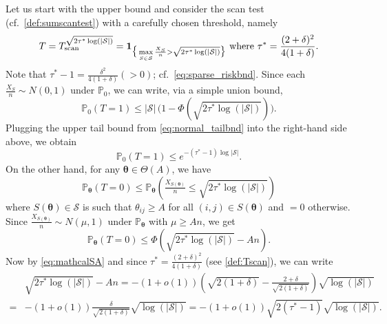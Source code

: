 \documentclass[11pt,reqno,letterpaper]{amsart}
\numberwithin{equation}{section}
\theoremstyle{plain}
\def \btheta{\boldsymbol{\theta}}
\def \P{\mathbb{P}}
\begin{document}
 Let us start with the upper bound and 
consider the scan test (cf.~\eqref{def:sumscantest}) with a carefully chosen threshold, namely
\begin{equation}\label{def:Tscan}
T = T_{{\rm scan}}^{\sqrt{2\tau^*\log(|\mathcal{S}|)}} = \mathbf{1}_{\big\{\max\limits_{S\in 
\mathcal{S}}\frac{X_{S}}{n}>\sqrt{2\tau^*\log(|\mathcal{S}|)}\big\}}\,\, 
\mbox{where }  \tau^\ast = \frac{(2 + \delta)^2}{4(1 + \delta)}.
\end{equation}
Note that $\tau^\ast - 1 = \frac{\delta^2}{4(1 + \delta)} (> 0)$; cf.~\eqref{eq:sparse_riskbnd}.
Since each $\frac{X_S}{n} \sim N(0, 1)$ under $\P_0$, we can write, via a simple union bound, 
\begin{equation*}%
\P_0(T = 1) \le |\mathcal S| \, \big(1 - \Phi(\sqrt{2\tau^*\log(|\mathcal{S}|)})\big).
\end{equation*}
Plugging the upper tail bound from \eqref{eq:normal_tailbnd} into the right-hand side above, we obtain
\begin{equation}\label{eq:scan_upperP0}
\P_0(T = 1) \le %
e^{-(\tau^\ast - 1) \log |\mathcal S|}.
\end{equation}
On the other hand, for any $\btheta \in \Theta(A)$, we have
\begin{equation*}
\P_{\btheta}(T = 0) \le  \P_{\btheta}\left(\tfrac{X_{S(\btheta)}}{n}  \le \sqrt{2\tau^*\log(|\mathcal{S}|)} \right)
\end{equation*}
where $S(\btheta) \in \mathcal S$ is such that $\theta_{ij} \ge A$ for all $(i, j) 
\in S(\btheta)$ and $= 0$ otherwise. Since $\frac{X_{S(\btheta)}}{n} \sim N(\mu, 1)$ under $\P_{\btheta}$ with $\mu \ge An$, we get
\begin{equation}\label{eq:scan_upperP2}
\P_{\btheta}(T = 0) \le  \Phi\left(\sqrt{2\tau^*\log(|\mathcal{S}|)} - A n \right).
\end{equation}
Now by \eqref{eq:mathcalSA} and since $\tau^\ast = \frac{(2 + \delta)^2}{4(1 + \delta)}$ (see \eqref{def:Tscan}), we can write
\begin{equation*}%
\begin{split}
&\sqrt{2\tau^*\log(|\mathcal{S}|)} - An = -(1 + o(1))\left(\sqrt{2(1 + \delta)} - \frac{2 + \delta}{\sqrt{2(1 + \delta)}}\right) \sqrt{\log(|\mathcal{S}|)}\\
=& -(1 + o(1)) \frac{\delta}{\sqrt{2(1 + \delta)}} \sqrt{\log(|\mathcal{S}|)} = -(1 + o(1)) \sqrt{2(\tau^\ast - 1)} \sqrt{\log(|\mathcal{S}|)}.
\end{split}
\end{equation*}
\end{document}

